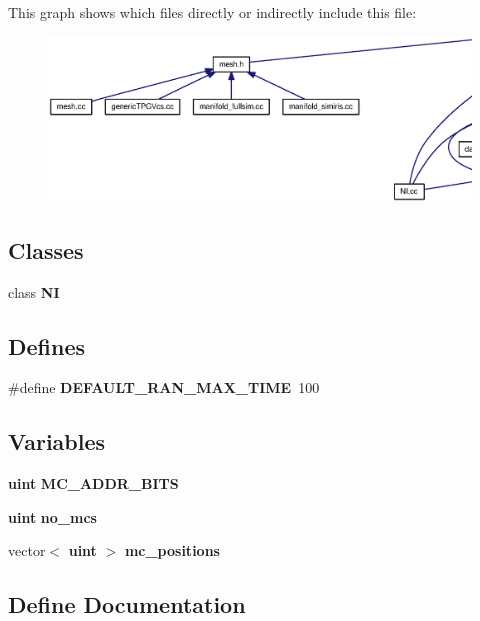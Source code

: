 This graph shows which files directly or indirectly include this file:\nopagebreak
\begin{figure}[H]
\begin{center}
\leavevmode
\includegraphics[width=420pt]{NI_8h__dep__incl}
\end{center}
\end{figure}
\subsection*{Classes}
\begin{CompactItemize}
\item 
class {\bf NI}
\end{CompactItemize}
\subsection*{Defines}
\begin{CompactItemize}
\item 
\#define {\bf DEFAULT\_\-RAN\_\-MAX\_\-TIME}~100
\end{CompactItemize}
\subsection*{Variables}
\begin{CompactItemize}
\item 
{\bf uint} {\bf MC\_\-ADDR\_\-BITS}
\item 
{\bf uint} {\bf no\_\-mcs}
\item 
vector$<$ {\bf uint} $>$ {\bf mc\_\-positions}
\end{CompactItemize}


\subsection{Define Documentation}
